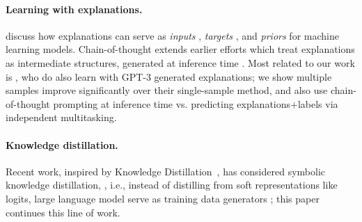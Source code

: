 \documentclass[11pt]{article}
\newcommand\jack[1]{{\color{orange}[#1]$_{Jack}$}}
\begin{document}
\paragraph{Learning with explanations.}
\citet{hase2022can} discuss how explanations can serve as \emph{inputs} \cite{talmor2020leap}, \emph{targets} \cite{hendricks2016generating,fidler2017teaching,camburu2018snli,zhou2020towards,narang2020wt5,Kayser_2021_ICCV,wiegreffe2021reframing}, and \emph{priors} \cite{zhang2016rationale,srivastava2018zero} for machine learning models.
Chain-of-thought extends earlier efforts which treat explanations as intermediate structures, generated at inference time \cite{rajani2019explain}. Most related to our work is \citet{li2022explanations}, who do also learn with GPT-3 generated explanations; we show multiple samples improve significantly over their single-sample method, and also use chain-of-thought prompting at inference time vs. predicting explanations+labels via independent multitasking.



\paragraph{Knowledge distillation.} Recent work, inspired by Knowledge Distillation~\cite{hinton2015distilling}, has considered symbolic knowledge distillation, \cite{west2021symbolic}, i.e., instead of distilling from soft representations like logits,
large language model serve as training data generators \cite{xiong2019pretrained,petroni2019language,schick-schutze-2021-generating,west2021symbolic,liu2022wanli,meng2022generating,bhagavatula2022i2d2}; this paper continues this line of work. %
\end{document}

